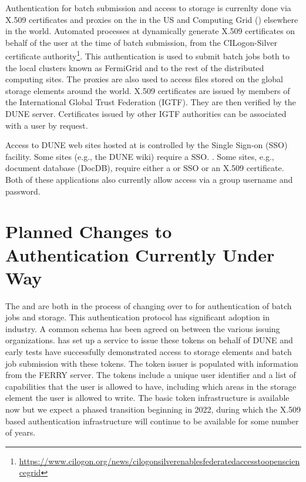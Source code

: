 \documentclass[../main-v1.tex]{subfiles}
\begin{document}
Authentication for batch submission and access to storage is currenlty done via X.509 certificates and proxies
on the %
 in the US and  %
Computing Grid () elsewhere in the world.  %
Automated processes %
at  %
dynamically generate 
X.509 certificates on behalf of the user at the time of batch submission, from the CILogon-Silver 
certificate authority\footnote{\url{https://www.cilogon.org/news/cilogonsilverenablesfederatedaccesstoopensciencegrid}}. This authentication is used to submit batch jobs both to the local
 clusters known as FermiGrid and to the rest of the distributed computing sites.  The proxies are
also used to access files %
stored on the global storage elements around the world.  
X.509 certificates are issued by members of the International Global Trust Federation (IGTF).  They are then verified 
by the DUNE  server.  Certificates issued by other IGTF authorities can be associated with a user by request.

Access to DUNE web sites hosted at  is controlled by the  Single Sign-on (SSO) facility.  Some sites (e.g., the DUNE wiki) %
require a  SSO.
. Some sites, e.g., %
document database (DocDB), require either a  or  SSO or  %
an X.509 certificate. %
Both of these applications also currently allow access via a group username and password.


\section{Planned Changes to Authentication Currently Under Way}

The  and  are both in the process of changing over to  %
for authentication of batch jobs and storage. This %
authentication protocol %
has significant adoption in industry. A common schema has been agreed on between the various issuing organizations. %
 has set up a %
service to issue these tokens on behalf of DUNE and early tests have %
successfully demonstrated access to storage elements and batch job submission with these tokens. %
The token issuer is populated with information from the FERRY server. %
The tokens include a unique user identifier %
and a list of capabilities that the user is allowed to have, including which 
areas in the storage element the user is allowed to write.  The basic token infrastructure is available now but we expect a phased transition beginning in 2022, during which %
the X.509 
based authentication infrastructure will continue to be available for some number of years.
\end{document}
